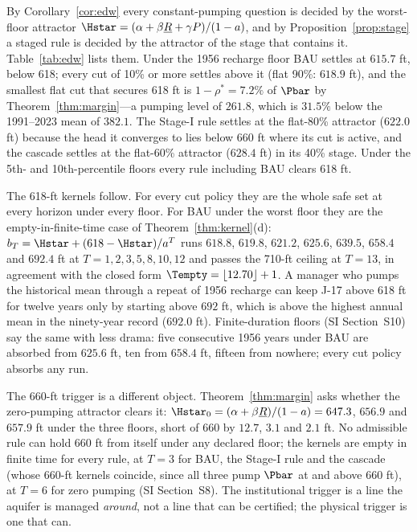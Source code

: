 By Corollary~\ref{cor:edw} every constant-pumping question is decided by the worst-floor attractor $\Hstar=(\alpha+\beta\underline R+\gamma P)/(1-a)$, and by Proposition~\ref{prop:stage} a staged rule is decided by the attractor of the stage that contains it. Table~\ref{tab:edw} lists them. Under the 1956 recharge floor BAU settles at $615.7$ ft, below 618; every cut of 10\% or more settles above it (flat 90\%: $618.9$ ft), and the smallest flat cut that secures 618 ft is $1-\rho^{*}=7.2\%$ of $\Pbar$ by Theorem~\ref{thm:margin}---a pumping level of $261.8$, which is $31.5\%$ below the 1991--2023 mean of $382.1$. The Stage-I rule settles at the flat-80\% attractor ($622.0$ ft) because the head it converges to lies below 660 ft where its cut is active, and the cascade settles at the flat-60\% attractor ($628.4$ ft) in its 40\% stage. Under the 5th- and 10th-percentile floors every rule including BAU clears 618 ft.



The 618-ft kernels follow. For every cut policy they are the whole safe set at every horizon under every floor. For BAU under the worst floor they are the empty-in-finite-time case of Theorem~\ref{thm:kernel}(d): $b_T=\Hstar+(618-\Hstar)/a^{T}$ runs $618.8$, $619.8$, $621.2$, $625.6$, $639.5$, $658.4$ and $692.4$ ft at $T=1,2,3,5,8,10,12$ and passes the 710-ft ceiling at $T=13$, in agreement with the closed form $\Tempty=\lfloor12.70\rfloor+1$. A manager who pumps the historical mean through a repeat of 1956 recharge can keep J-17 above 618 ft for twelve years only by starting above $692$ ft, which is above the highest annual mean in the ninety-year record ($692.0$ ft). Finite-duration floors (SI Section~S10) say the same with less drama: five consecutive 1956 years under BAU are absorbed from $625.6$ ft, ten from $658.4$ ft, fifteen from nowhere; every cut policy absorbs any run.

The 660-ft trigger is a different object. Theorem~\ref{thm:margin} asks whether the zero-pumping attractor clears it: $\Hstar_0=(\alpha+\beta\underline R)/(1-a)=647.3$, $656.9$ and $657.9$ ft under the three floors, short of 660 by $12.7$, $3.1$ and $2.1$ ft. No admissible rule can hold 660 ft from itself under any declared floor; the kernels are empty in finite time for every rule, at $T=3$ for BAU, the Stage-I rule and the cascade (whose 660-ft kernels coincide, since all three pump $\Pbar$ at and above 660 ft), at $T=6$ for zero pumping (SI Section~S8). The institutional trigger is a line the aquifer is managed \emph{around}, not a line that can be certified; the physical trigger is one that can.

